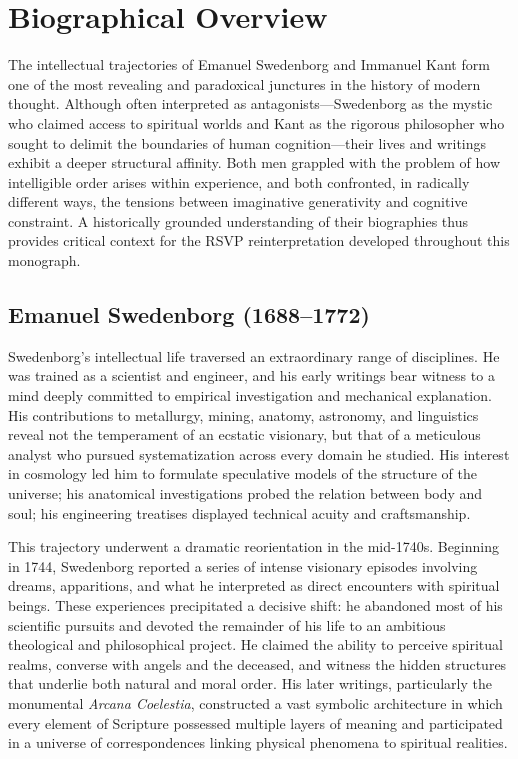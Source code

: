 \documentclass[12pt]{article}
\begin{document}
\section{Biographical Overview}

The intellectual trajectories of Emanuel Swedenborg and Immanuel Kant form one 
of the most revealing and paradoxical junctures in the history of modern 
thought. Although often interpreted as antagonists—Swedenborg as the mystic who 
claimed access to spiritual worlds and Kant as the rigorous philosopher who 
sought to delimit the boundaries of human cognition—their lives and writings 
exhibit a deeper structural affinity. Both men grappled with the problem of how 
intelligible order arises within experience, and both confronted, in radically 
different ways, the tensions between imaginative generativity and cognitive 
constraint. A historically grounded understanding of their biographies thus 
provides critical context for the RSVP reinterpretation developed throughout 
this monograph.

\subsection{Emanuel Swedenborg (1688--1772)}

Swedenborg’s intellectual life traversed an extraordinary range of disciplines. 
He was trained as a scientist and engineer, and his early writings bear 
witness to a mind deeply committed to empirical investigation and mechanical 
explanation. His contributions to metallurgy, mining, anatomy, astronomy, and 
linguistics reveal not the temperament of an ecstatic visionary, but that of a 
meticulous analyst who pursued systematization across every domain he studied. 
His interest in cosmology led him to formulate speculative models of the 
structure of the universe; his anatomical investigations probed the relation 
between body and soul; his engineering treatises displayed technical acuity 
and craftsmanship.

This trajectory underwent a dramatic reorientation in the mid-1740s. 
Beginning in 1744, Swedenborg reported a series of intense visionary episodes 
involving dreams, apparitions, and what he interpreted as direct encounters 
with spiritual beings. These experiences precipitated a decisive shift: he 
abandoned most of his scientific pursuits and devoted the remainder of his 
life to an ambitious theological and philosophical project. He claimed the 
ability to perceive spiritual realms, converse with angels and the deceased, 
and witness the hidden structures that underlie both natural and moral order. 
His later writings, particularly the monumental \emph{Arcana Coelestia}, 
constructed a vast symbolic architecture in which every element of Scripture 
possessed multiple layers of meaning and participated in a universe of 
correspondences linking physical phenomena to spiritual realities.
\end{document}
